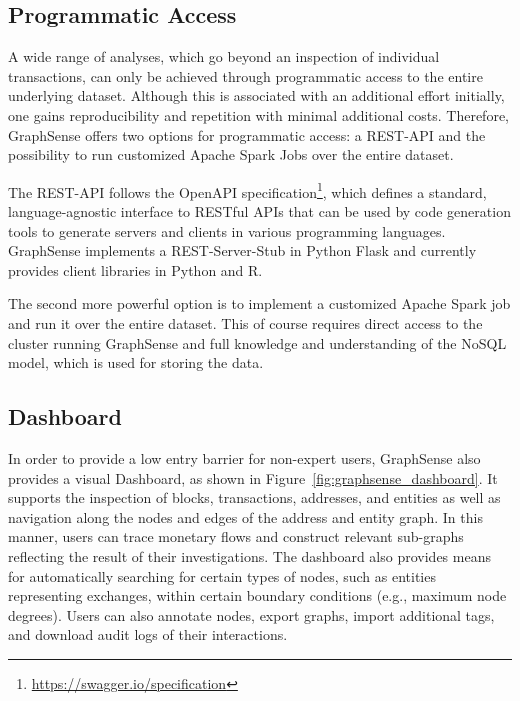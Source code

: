 \subsection{Programmatic Access}

A wide range of analyses, which go beyond an inspection of individual transactions, can only be achieved through programmatic access to the entire underlying dataset. Although this is associated with an additional effort initially, one gains reproducibility and repetition with minimal additional costs. Therefore, GraphSense offers two options for programmatic access: a REST-API and the possibility to run customized Apache Spark Jobs over the entire dataset.

The REST-API follows the OpenAPI specification\footnote{\url{https://swagger.io/specification}}, which defines a standard, language-agnostic interface to RESTful APIs that can be used by code generation tools to generate servers and clients in various programming languages. GraphSense implements a REST-Server-Stub in Python Flask and currently provides client libraries in Python and R.

The second more powerful option is to implement a customized Apache Spark job and run it over the entire dataset. This of course requires direct access to the cluster running GraphSense and full knowledge and understanding of the NoSQL model, which is used for storing the data.

\subsection{Dashboard}

In order to provide a low entry barrier for non-expert users, GraphSense also provides a visual Dashboard, as shown in Figure~\ref{fig:graphsense_dashboard}. It supports the inspection of blocks, transactions, addresses, and entities as well as navigation along the nodes and edges of the address and entity graph. In this manner, users can trace monetary flows and construct relevant sub-graphs reflecting the result of their investigations. The dashboard also provides means for automatically searching for certain types of nodes, such as entities representing exchanges, within certain boundary conditions (e.g., maximum node degrees). Users can also annotate nodes, export graphs, import additional tags, and download audit logs of their interactions.

